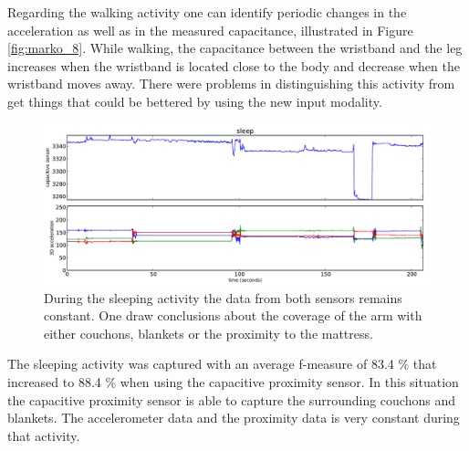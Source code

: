 \documentclass[runningheads,a4paper]{llncs}
\begin{document}
Regarding the walking activity one can identify periodic changes in the acceleration as well as in the measured capacitance, illustrated in Figure \ref{fig:marko_8}. While walking, the capacitance between the wristband and the leg increases when the wristband is located close to the body and decrease when the wristband moves away. There were problems in distinguishing this activity from get things that could be bettered by using the new input modality. 

\begin{figure}[htbp]
	\centering
		\includegraphics[width=1.00\textwidth]{../Auswertung/images/eugen_9.pdf}
	\caption{During the sleeping activity the data from both sensors remains constant. One draw conclusions about the coverage of the arm with either couchons, blankets or the proximity to the mattress.}
	\label{fig:eugen_9}
\end{figure}

The sleeping activity was captured with an average f-measure of 83.4 \% that increased to 88.4 \% when using the capacitive proximity sensor. In this situation the capacitive proximity sensor is able to capture the surrounding couchons and blankets. The accelerometer data and the proximity data is very constant during that activity. 
\end{document}
